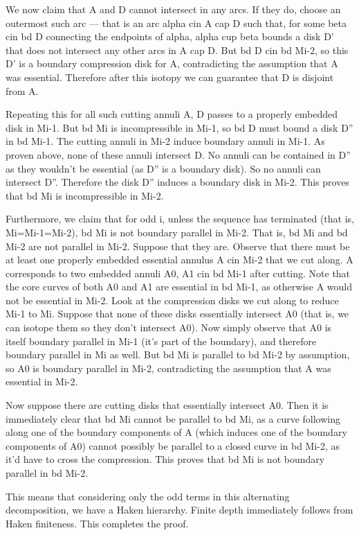 We now claim that A and D cannot intersect in any arcs. If they do, choose an
outermost such arc --- that is an arc alpha cin A cap D such that, for some
beta cin bd D connecting the endpoints of alpha, alpha cup beta bounds a disk
D' that does not intersect any other arcs in A cap D. But bd D cin bd Mi-2, so
this D' is a boundary compression disk for A, contradicting the assumption that
A was essential. Therefore after this isotopy we can guarantee that D is
disjoint from A.

Repeating this for all such cutting annuli A, D passes to a properly embedded
disk in Mi-1. But bd Mi is incompressible in Mi-1, so bd D must bound a disk
D'' in bd Mi-1. The cutting annuli in Mi-2 induce boundary annuli in Mi-1. As
proven above, none of these annuli intersect D. No annuli can be contained in
D'' as they wouldn't be essential (as D'' is a boundary disk). So no annuli can
intersect D''. Therefore the disk D'' induces a boundary disk in Mi-2. This
proves that bd Mi is incompressible in Mi-2.

Furthermore, we claim that for odd i, unless the sequence has terminated (that
is, Mi=Mi-1=Mi-2), bd Mi is not boundary parallel in Mi-2. That is, bd Mi and
bd Mi-2 are not parallel in Mi-2. Suppose that they are. Observe that there
must be at least one properly embedded essential annulus A cin Mi-2 that we cut
along. A corresponds to two embedded annuli A0, A1 cin bd Mi-1 after cutting.
Note that the core curves of both A0 and A1 are essential in bd Mi-1, as
otherwise A would not be essential in Mi-2. Look at the compression disks we
cut along to reduce Mi-1 to Mi. Suppose that none of these disks essentially
intersect A0 (that is, we can isotope them so they don't intersect A0). Now
simply observe that A0 is itself boundary parallel in Mi-1 (it's part of the
boundary), and therefore boundary parallel in Mi as well. But bd Mi is parallel
to bd Mi-2 by assumption, so A0 is boundary parallel in Mi-2, contradicting the
assumption that A was essential in Mi-2.

Now suppose there are cutting disks that essentially intersect A0. Then it is
immediately clear that bd Mi cannot be parallel to bd Mi, as a curve following
along one of the boundary components of A (which induces one of the boundary
components of A0) cannot possibly be parallel to a closed curve in bd Mi-2, as
it'd have to cross the compression. This proves that bd Mi is not boundary
parallel in bd Mi-2.

This means that considering only the odd terms in this alternating
decomposition, we have a Haken hierarchy. Finite depth immediately follows from
Haken finiteness. This completes the proof.

